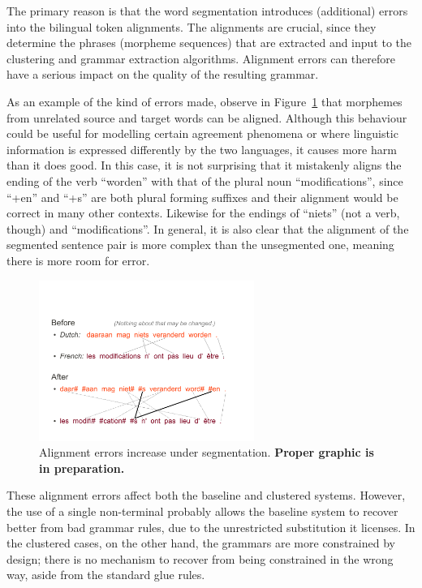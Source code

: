The primary reason is that the word segmentation introduces (additional) errors into the bilingual token alignments.
The alignments are crucial, since they determine the phrases (morpheme sequences) that are extracted and input to the clustering and grammar extraction algorithms.
Alignment errors can therefore have a serious impact on the quality of the resulting grammar.

As an example of the kind of errors made, observe in Figure~\ref{fig:m_alignment_error} that morphemes from unrelated source and target words can be aligned.
Although this behaviour could be useful for modelling certain agreement phenomena or where linguistic information is expressed differently by the two languages, it causes more harm than it does good. 
In this case, it is not surprising that it mistakenly aligns the ending of the verb ``worden'' with that of the plural noun ``modifications'', since ``+en'' and ``+s'' are both plural forming suffixes and their alignment would be correct in many other contexts.
Likewise for the endings of ``niets'' (not a verb, though) and ``modifications''.
In general, it is also clear that the alignment of the segmented sentence pair is more complex than the unsegmented one, meaning there is more room for error.

\begin{figure}[hb]
  \centering
  \includegraphics[width=7cm ]{morphology/alignment}
  \caption{Alignment errors increase under segmentation. \textbf{Proper graphic is in preparation.}}
  \label{fig:m_alignment_error}
\end{figure}

These alignment errors affect both the baseline and clustered systems.
However, the use of a single non-terminal probably allows the baseline system to recover better from bad grammar rules, due to the unrestricted substitution it licenses.
In the clustered cases, on the other hand, the grammars are more constrained by design; there is no mechanism to recover from being constrained in the wrong way, aside from the standard glue rules.

